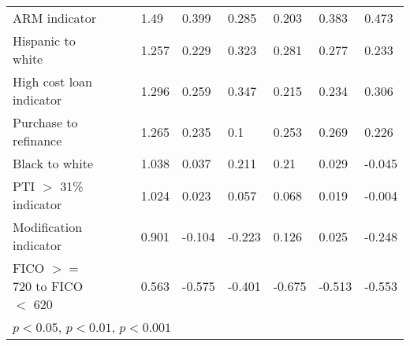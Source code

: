 {\begin{tabular}{l*{8}{l}}
\hspace{5mm} ARM indicator&&&1.49&0.399\sym{***}&0.285\sym{***}&0.203\sym{***}&0.383\sym{***}&0.473\sym{***}\\
\hspace{5mm} Hispanic to white&&&1.257&0.229\sym{***}&0.323\sym{***}&0.281\sym{***}&0.277\sym{***}&0.233\sym{***}\\
\hspace{5mm} High cost loan indicator&&&1.296&0.259\sym{***}&0.347\sym{***}&0.215\sym{***}&0.234\sym{***}&0.306\sym{***}\\
\hspace{5mm} Purchase to refinance&&&1.265&0.235\sym{***}&0.1\sym{***}&0.253\sym{***}&0.269\sym{***}&0.226\sym{***}\\
\hspace{5mm} Black to white&&&1.038&0.037\sym{*}&0.211\sym{***}&0.21\sym{***}&0.029&-0.045\sym{*}\\
\hspace{5mm} PTI $>$ 31\% indicator&&&1.024&0.023&0.057\sym{*}&0.068\sym{**}&0.019&-0.004\\
\hspace{5mm} Modification indicator&&&0.901&-0.104\sym{***}&-0.223\sym{***}&0.126\sym{***}&0.025&-0.248\sym{***}\\
\hspace{5mm} FICO $>=$ 720 to FICO $<$ 620&&&0.563&-0.575\sym{***}&-0.401\sym{***}&-0.675\sym{***}&-0.513\sym{***}&-0.553\sym{***}\\

\hline\hline
\multicolumn{9}{l}{\footnotesize \sym{*} \(p<0.05\), \sym{**} \(p<0.01\), \sym{***} \(p<0.001\)}\\
\end{tabular}
}
